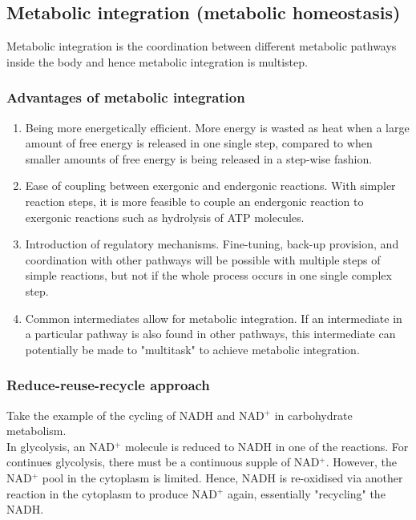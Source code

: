 \documentclass[11pt]{article}
\begin{document}
\newpage

\subsection{Metabolic integration (metabolic homeostasis)}
\label{sec:org470ea2f}
Metabolic integration is the coordination between different metabolic pathways inside the body and hence metabolic integration is multistep.

\subsubsection{Advantages of metabolic integration}
\label{sec:org862cbc2}
\begin{enumerate}
\item Being more energetically efficient. More energy is wasted as heat when a large amount of free energy is released in one single step, compared to when smaller amounts of free energy is being released in a step-wise fashion.
\item Ease of coupling between exergonic and endergonic reactions. With simpler reaction steps, it is more feasible to couple an endergonic reaction to exergonic reactions such as hydrolysis of ATP molecules.
\item Introduction of regulatory mechanisms. Fine-tuning, back-up provision, and coordination with other pathways will be possible with multiple steps of simple reactions, but not if the whole process occurs in one single complex step.
\item Common intermediates allow for metabolic integration. If an intermediate in a particular pathway is also found in other pathways, this intermediate can potentially be made to "multitask" to achieve metabolic integration.
\end{enumerate}

\newpage

\subsubsection{Reduce-reuse-recycle approach}
\label{sec:org45c7813}
Take the example of the cycling of NADH and NAD\(^+\) in carbohydrate metabolism.
\\[0pt]

In glycolysis, an NAD\(^+\) molecule is reduced to NADH in one of the reactions. For continues glycolysis, there must be a continuous supple of NAD\(^+\). However, the NAD\(^+\) pool in the cytoplasm is limited. Hence, NADH is re-oxidised via another reaction in the cytoplasm to produce NAD\(^+\) again, essentially "recycling" the NADH.
\\[0pt]
\end{document}
